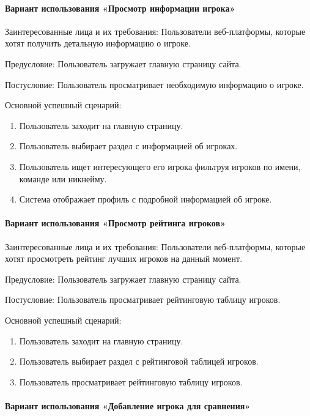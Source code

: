 \paragraph{Вариант использования «Просмотр информации игрока»}

Заинтересованные лица и их требования: Пользователи веб-платформы, которые хотят получить детальную информацию о игроке.

Предусловие: Пользователь загружает главную страницу сайта.

Постусловие: Пользователь просматривает необходимую информацию о игроке.

Основной успешный сценарий:
\begin{enumerate}
	\item Пользователь заходит на главную страницу.
	\item Пользователь выбирает раздел с информацией об игроках.
	\item Пользователь ищет интересующего его игрока фильтруя игроков по имени, команде или никнейму.
	\item Система отображает профиль с подробной информацией об игроке.
\end{enumerate}

\paragraph{Вариант использования «Просмотр рейтинга игроков»}

Заинтересованные лица и их требования: Пользователи веб-платформы, которые хотят просмотреть рейтинг лучших игроков на данный момент.

Предусловие: Пользователь загружает главную страницу сайта.

Постусловие: Пользователь просматривает рейтинговую таблицу игроков.

Основной успешный сценарий:
\begin{enumerate}
	\item Пользователь заходит на главную страницу.
	\item Пользователь выбирает раздел с рейтинговой таблицей игроков.
	\item Пользователь просматривает рейтинговую таблицу игроков.
\end{enumerate}

\paragraph{Вариант использования «Добавление игрока для сравнения»}

